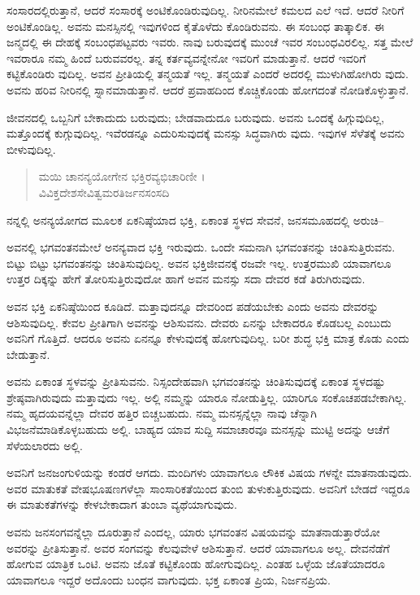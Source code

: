 ಸಂಸಾರದಲ್ಲಿರುತ್ತಾನೆ, ಆದರೆ ಸಂಸಾರಕ್ಕೆ ಅಂಟಿಕೊಂಡಿರುವುದಿಲ್ಲ. ನೀರಿನಮೇಲೆ ಕಮಲದ ಎಲೆ ಇದೆ. ಆದರೆ ನೀರಿಗೆ ಅಂಟಿಕೊಂಡಿಲ್ಲ. ಅವನು ಮನಸ್ಸಿನಲ್ಲಿ ಇವುಗಳಿಂದ ಕೈತೊಳೆದು ಕೊಂಡಿರುವನು. ಈ ಸಂಬಂಧ ತಾತ್ಕಾಲಿಕ. ಈ ಜನ್ಮದಲ್ಲಿ ಈ ದೇಹಕ್ಕೆ ಸಂಬಂಧಪಟ್ಟವರು ಇವರು. ನಾವು ಬರುವುದಕ್ಕೆ ಮುಂಚೆ ಇವರ ಸಂಬಂಧವಿರಲಿಲ್ಲ. ಸತ್ತ ಮೇಲೆ ಇವರಾರೂ ನಮ್ಮ ಹಿಂದೆ ಬರುವವರಲ್ಲ. ತನ್ನ ಕರ್ತವ್ಯವನ್ನೇನೋ ಇವರಿಗೆ ಮಾಡುತ್ತಾನೆ. ಆದರೆ ಇವರಿಗೆ ಕಟ್ಟಿಕೊಂಡಿರು ವುದಿಲ್ಲ. ಅವನ ಪ್ರೀತಿಯಲ್ಲಿ ತನ್ಮಯತೆ ಇಲ್ಲ. ತನ್ಮಯತೆ ಎಂದರೆ ಅದರಲ್ಲಿ ಮುಳುಗಿಹೋಗಿರು ವುದು. ಅವನು ಹರಿವ ನೀರಿನಲ್ಲಿ ಸ್ನಾನಮಾಡುತ್ತಾನೆ. ಆದರೆ ಪ್ರವಾಹದಿಂದ ಕೊಚ್ಚಿಕೊಂಡು ಹೋಗದಂತೆ ನೋಡಿಕೊಳ್ಳುತ್ತಾನೆ.

ಜೀವನದಲ್ಲಿ ಒಬ್ಬನಿಗೆ ಬೇಕಾದುದು ಬರುವುದು; ಬೇಡವಾದುದೂ ಬರುವುದು. ಅವನು ಒಂದಕ್ಕೆ ಹಿಗ್ಗುವುದಿಲ್ಲ, ಮತ್ತೊಂದಕ್ಕೆ ಕುಗ್ಗುವುದಿಲ್ಲ. ಇವೆರಡನ್ನೂ ಎದುರಿಸುವುದಕ್ಕೆ ಮನಸ್ಸು ಸಿದ್ಧವಾಗಿರು ವುದು. ಇವುಗಳ ಸೆಳೆತಕ್ಕೆ ಅವನು ಬೀಳುವುದಿಲ್ಲ.

\begin{verse}
ಮಯಿ ಚಾನನ್ಯಯೋಗೇನ ಭಕ್ತಿರವ್ಯಭಿಚಾರಿಣೀ ।\\ವಿವಿಕ್ತದೇಶಸೇವಿತ್ವಮರತಿರ್ಜನಸಂಸದಿ 
\end{verse}

{\small ನನ್ನಲ್ಲಿ ಅನನ್ಯಯೋಗದ ಮೂಲಕ ಏಕನಿಷ್ಠೆಯಾದ ಭಕ್ತಿ, ಏಕಾಂತ ಸ್ಥಳದ ಸೇವನೆ, ಜನಸಮೂಹದಲ್ಲಿ ಅರುಚಿ–}

ಅವನಲ್ಲಿ ಭಗವಂತನಮೇಲೆ ಅನನ್ಯವಾದ ಭಕ್ತಿ ಇರುವುದು. ಒಂದೇ ಸಮನಾಗಿ ಭಗವಂತನನ್ನು ಚಿಂತಿಸುತ್ತಿರುವನು. ಬಿಟ್ಟು ಬಿಟ್ಟು ಭಗವಂತನನ್ನು ಚಿಂತಿಸುವುದಿಲ್ಲ. ಅವನ ಭಕ್ತಿಜೀವನಕ್ಕೆ ರಜವೇ ಇಲ್ಲ. ಉತ್ತರಮುಖಿ ಯಾವಾಗಲೂ ಉತ್ತರ ದಿಕ್ಕನ್ನು ಹೇಗೆ ತೋರಿಸುತ್ತಿರುವುದೋ ಹಾಗೆ ಅವನ ಮನಸ್ಸು ಸದಾ ದೇವರ ಕಡೆ ತಿರುಗಿರುವುದು.

ಅವನ ಭಕ್ತಿ ಏಕನಿಷ್ಠೆಯಿಂದ ಕೂಡಿದೆ. ಮತ್ತಾವುದನ್ನೂ ದೇವರಿಂದ ಪಡೆಯಬೇಕು ಎಂದು ಅವನು ದೇವರನ್ನು ಆಶಿಸುವುದಿಲ್ಲ. ಕೇವಲ ಪ್ರೀತಿಗಾಗಿ ಅವನನ್ನು ಆಶಿಸುವನು. ದೇವರು ಏನನ್ನು ಬೇಕಾದರೂ ಕೊಡಬಲ್ಲ ಎಂಬುದು ಅವನಿಗೆ ಗೊತ್ತಿದೆ. ಆದರೂ ಅವನು ಏನನ್ನೂ ಕೇಳುವುದಕ್ಕೆ ಹೋಗುವುದಿಲ್ಲ. ಬರೀ ಶುದ್ಧ ಭಕ್ತಿ ಮಾತ್ರ ಕೊಡು ಎಂದು ಬೇಡುತ್ತಾನೆ.

ಅವನು ಏಕಾಂತ ಸ್ಥಳವನ್ನು ಪ್ರೀತಿಸುವನು. ನಿಸ್ಸಂದೇಹವಾಗಿ ಭಗವಂತನನ್ನು ಚಿಂತಿಸುವುದಕ್ಕೆ ಏಕಾಂತ ಸ್ಥಳದಷ್ಟು ಶ್ರೇಷ್ಠವಾಗಿರುವುದು ಮತ್ತಾವುದು ಇಲ್ಲ. ಅಲ್ಲಿ ನಮ್ಮನ್ನು ಯಾರೂ ನೋಡುತ್ತಿಲ್ಲ. ಯಾರಿಗೂ ಸಂಕೊಚಪಡಬೇಕಾಗಿಲ್ಲ. ನಮ್ಮ ಹೃದಯವನ್ನೆಲ್ಲಾ ದೇವರ ಹತ್ತಿರ ಬಿಚ್ಚಬಹುದು. ನಮ್ಮ ಮನಸ್ಸನ್ನೆಲ್ಲಾ ನಾವು ಚೆನ್ನಾಗಿ ವಿಭಜನೆಮಾಡಿಕೊಳ್ಳಬಹುದು ಅಲ್ಲಿ. ಬಾಹ್ಯದ ಯಾವ ಸುದ್ದಿ ಸಮಾಚಾರವೂ ಮನಸ್ಸನ್ನು ಮುಟ್ಟಿ ಅದನ್ನು ಆಚೆಗೆ ಸೆಳೆಯಲಾರದು ಅಲ್ಲಿ.

ಅವನಿಗೆ ಜನಜಂಗುಳಿಯನ್ನು ಕಂಡರೆ ಆಗದು. ಮಂದಿಗಳು ಯಾವಾಗಲೂ ಲೌಕಿಕ ವಿಷಯ ಗಳನ್ನೇ ಮಾತನಾಡುವುದು. ಅವರ ಮಾತುಕತೆ ವೇಷಭೂಷಣಗಳೆಲ್ಲಾ ಸಾಂಸಾರಿಕತೆಯಿಂದ ತುಂಬಿ ತುಳುಕುತ್ತಿರುವುದು. ಅವನಿಗೆ ಬೇಡದೆ ಇದ್ದರೂ ಈ ಮಾತುಕತೆಗಳನ್ನು ಕೇಳಬೇಕಾದಾಗ ತುಂಬಾ ವ್ಯಥೆಯಾಗುವುದು.

ಅವನು ಜನಸಂಗವನ್ನೆಲ್ಲಾ ದೂರುತ್ತಾನೆ ಎಂದಲ್ಲ, ಯಾರು ಭಗವಂತನ ವಿಷಯವನ್ನು ಮಾತನಾಡುತ್ತಾರೆಯೋ ಅವರನ್ನು ಪ್ರೀತಿಸುತ್ತಾನೆ. ಅವರ ಸಂಗವನ್ನು ಕೆಲವುವೇಳೆ ಆಶಿಸುತ್ತಾನೆ. ಆದರೆ ಯಾವಾಗಲೂ ಅಲ್ಲ. ದೇವನೆಡೆಗೆ ಹೋಗುವ ಯಾತ್ರಿಕ ಒಂಟಿ. ಅವನು ಜೊತೆ ಕಟ್ಟಿಕೊಂಡು ಹೋಗುವುದಿಲ್ಲ. ಎಂತಹ ಒಳ್ಳೆಯ ಜೊತೆಯಾದರೂ ಯಾವಾಗಲೂ ಇದ್ದರೆ ಅದೊಂದು ಬಂಧನ ವಾಗುವುದು. ಭಕ್ತ ಏಕಾಂತ ಪ್ರಿಯ, ನಿರ್ಜನಪ್ರಿಯ.\eng{}

